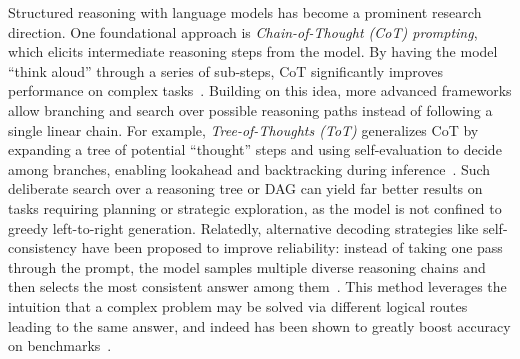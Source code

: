 \documentclass{article}
\theoremstyle{plain}
\theoremstyle{definition}
\theoremstyle{remark}
\begin{document}
Structured reasoning with language models has become a prominent research direction. One foundational approach is \emph{Chain-of-Thought (CoT) prompting}, which elicits intermediate reasoning steps from the model. By having the model ``think aloud'' through a series of sub-steps, CoT significantly improves performance on complex tasks~\cite{wei2022chain}. Building on this idea, more advanced frameworks allow branching and search over possible reasoning paths instead of following a single linear chain. For example, \emph{Tree-of-Thoughts (ToT)} generalizes CoT by expanding a tree of potential ``thought'' steps and using self-evaluation to decide among branches, enabling lookahead and backtracking during inference~\cite{yao2023tree}. Such deliberate search over a reasoning tree or DAG can yield far better results on tasks requiring planning or strategic exploration, as the model is not confined to greedy left-to-right generation. Relatedly, alternative decoding strategies like self-consistency have been proposed to improve reliability: instead of taking one pass through the prompt, the model samples multiple diverse reasoning chains and then selects the most consistent answer among them~\cite{wang2022selfconsistency}. This method leverages the intuition that a complex problem may be solved via different logical routes leading to the same answer, and indeed has been shown to greatly boost accuracy on benchmarks~\cite{wang2022selfconsistency}.
\end{document}
